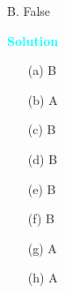 \documentclass[10pt]{article}
\newenvironment{solution}
    { \begin{mdframed}[backgroundcolor=gray!10] \textcolor{cyan}{\textbf{Solution}} \\}
    {  \end{mdframed}}
\begin{document}
\begin{enumerate}
\begin{itemize}
		            B. False
	      \end{itemize}
	      \begin{solution}
		      \begin{itemize}
			      \item[(a)] B
			      \item[(b)] A
			      \item[(c)] B
			      \item[(d)] B
			      \item[(e)] B
			      \item[(f)] B
			      \item[(g)] A
			      \item[(h)] A
		      \end{itemize}
	      \end{solution}



\end{enumerate}
\end{document}
